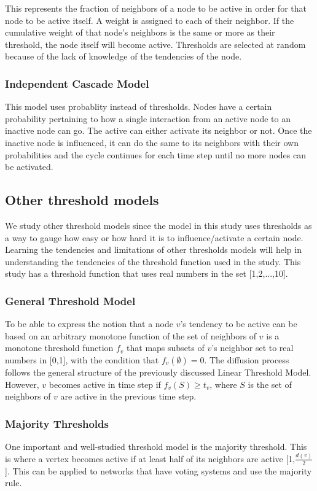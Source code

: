 This represents the fraction of neighbors of a node to be active in order for that node to be active itself.  A weight is assigned to each of their neighbor. If the cumulative weight of that node's neighbors is the same or more as their threshold, the node itself will become active. Thresholds are selected at random because of the lack of knowledge of the tendencies of the node.\cite{Kempe} 
\subsubsection{Independent Cascade Model}
This model uses probablity instead of thresholds. Nodes have a  certain probability pertaining to how a single interaction from an active node to an inactive node can go. The active can either activate its neighbor or not. Once the inactive node is influenced, it can do the same to its neighbors with their own probabilities and the cycle continues for each time step until no more nodes can be activated.\cite{Kempe}
\subsection{Other threshold models}
We study other threshold models since the model in this study uses thresholds as a way to gauge how easy or how hard it is to influence/activate a certain node. Learning the tendencies and limitations of other thresholds models will help in understanding the tendencies of the threshold function used in the study. This study has a threshold function that uses real numbers in the set [1,2,...,10].
\subsubsection{General Threshold Model}
To be able to express the notion that a node $v$'s tendency to be active can be based on an arbitrary monotone function of the set of neighbors of $v$ is a monotone threshold function $f_{v}$ that maps subsets of $v$'s neighbor set to real numbers in [0,1], with the condition that $f_{v}(\emptyset) = 0$. The diffusion process follows the general structure of the previously discussed Linear Threshold Model. However, $v$ becomes active in time step if $f_{v}(S) \geq t_{v}$, where $S$ is the set of neighbors of $v$ are active in the previous time step.\cite{Kempe}
\subsubsection{Majority Thresholds}
One important and well-studied threshold model is the majority threshold. This is where a vertex becomes active if at least half of its neighbors are active [1,$\frac{d(v)}{2}$].\cite{chen} This can be applied to networks that have voting systems and use the majority rule.
